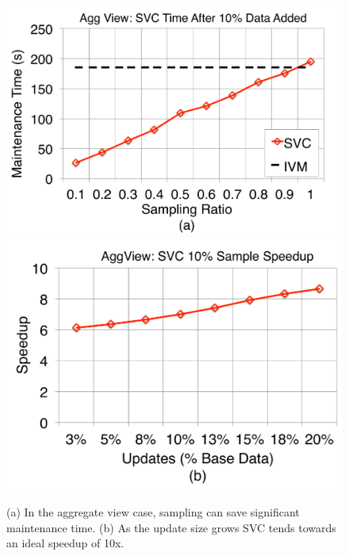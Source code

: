 \begin{figure}[t]\vspace{-2em}
\centering
 \includegraphics[scale=0.13]{exp/msdc_1.pdf}
 \includegraphics[scale=0.13]{exp/msdc_2.pdf}\vspace{-.5em}
   \caption{(a) In the aggregate view case, sampling can save significant maintenance time. (b) As the update size grows SVC tends towards an ideal speedup of 10x.\label{exp2-acc-sample}}
\end{figure}


